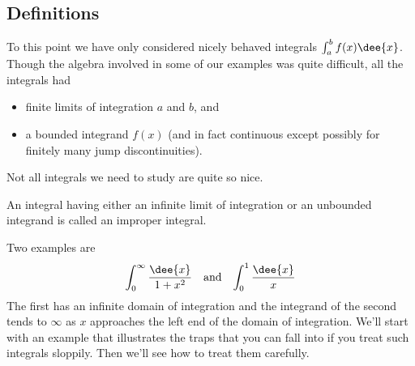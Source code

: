 \subsection{Definitions}
To this point we have only considered nicely behaved integrals $\int_a^b f(x)\dee{x}$.
Though the algebra involved in some of our examples was quite difficult, all the
integrals had
\begin{itemize}
\item finite limits of integration $a$ and $b$, and
\item a bounded integrand $f(x)$ (and in fact continuous except
possibly for finitely many jump discontinuities).
\end{itemize}
Not all integrals we need to study are quite so nice.
\begin{defn}\label{def_improp_int}
 An integral having either an infinite limit of integration or an unbounded
integrand is called an improper integral.
\end{defn}
Two examples are
\begin{align*}
\int_0^\infty\frac{\dee{x}}{1+x^2}&& \text{and}&&
\int_0^1\frac{\dee{x}}{x}
\end{align*}
The first has an infinite domain of integration and the integrand of the
second tends to $\infty$ as $x$ approaches the left end of the domain of
integration. We'll start with an example that illustrates the traps
that you can fall into if you treat such integrals sloppily. Then we'll
see how to treat them carefully.

